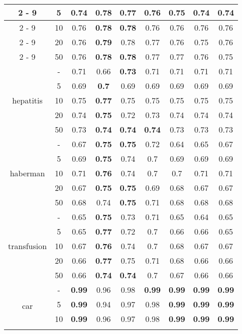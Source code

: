 \documentclass{article}%
\begin{document}
\begin{tabular}{c|c|ccccccc}
\cline{2%
-%
9}%
&5&0.74&\textbf{0.78}&0.77&0.76&0.75&0.74&0.74\\%
\cline{2%
-%
9}%
&10&0.76&\textbf{0.78}&\textbf{0.78}&0.76&0.76&0.76&0.76\\%
\cline{2%
-%
9}%
&20&0.76&\textbf{0.79}&0.78&0.77&0.76&0.75&0.76\\%
\cline{2%
-%
9}%
&50&0.76&\textbf{0.78}&\textbf{0.78}&0.77&0.77&0.76&0.75\\%
\hline%
\multirow{5}{*}{hepatitis}&{-}&0.71&0.66&\textbf{0.73}&0.71&0.71&0.71&0.71\\%
\cline{2%
-%
9}%
&5&0.69&\textbf{0.7}&0.69&0.69&0.69&0.69&0.69\\%
\cline{2%
-%
9}%
&10&0.75&\textbf{0.77}&0.75&0.75&0.75&0.75&0.75\\%
\cline{2%
-%
9}%
&20&0.74&\textbf{0.75}&0.72&0.73&0.74&0.74&0.74\\%
\cline{2%
-%
9}%
&50&0.73&\textbf{0.74}&\textbf{0.74}&\textbf{0.74}&0.73&0.73&0.73\\%
\hline%
\multirow{5}{*}{haberman}&{-}&0.67&\textbf{0.75}&\textbf{0.75}&0.72&0.64&0.65&0.67\\%
\cline{2%
-%
9}%
&5&0.69&\textbf{0.75}&0.74&0.7&0.69&0.69&0.69\\%
\cline{2%
-%
9}%
&10&0.71&\textbf{0.76}&0.74&0.7&0.7&0.71&0.71\\%
\cline{2%
-%
9}%
&20&0.67&\textbf{0.75}&\textbf{0.75}&0.69&0.68&0.67&0.67\\%
\cline{2%
-%
9}%
&50&0.68&0.74&\textbf{0.75}&0.71&0.68&0.68&0.68\\%
\hline%
\multirow{5}{*}{transfusion}&{-}&0.65&\textbf{0.75}&0.73&0.71&0.65&0.64&0.65\\%
\cline{2%
-%
9}%
&5&0.65&\textbf{0.77}&0.72&0.7&0.66&0.66&0.65\\%
\cline{2%
-%
9}%
&10&0.67&\textbf{0.76}&0.74&0.7&0.68&0.67&0.67\\%
\cline{2%
-%
9}%
&20&0.66&\textbf{0.77}&0.75&0.71&0.68&0.66&0.66\\%
\cline{2%
-%
9}%
&50&0.66&\textbf{0.74}&\textbf{0.74}&0.7&0.67&0.66&0.66\\%
\hline%
\multirow{5}{*}{car}&{-}&\textbf{0.99}&0.96&0.98&\textbf{0.99}&\textbf{0.99}&\textbf{0.99}&\textbf{0.99}\\%
\cline{2%
-%
9}%
&5&\textbf{0.99}&0.94&0.97&0.98&\textbf{0.99}&\textbf{0.99}&\textbf{0.99}\\%
\cline{2%
-%
9}%
&10&\textbf{0.99}&0.96&0.97&0.98&\textbf{0.99}&\textbf{0.99}&\textbf{0.99}\\%
\cline{2%
-%
9}%

\end{tabular}
\end{document}

